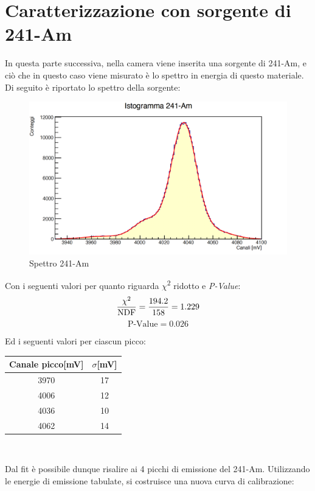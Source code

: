\documentclass[a4paper,10pt]{article}
\begin{document}
\section{Caratterizzazione con sorgente di 241-Am}
In questa parte successiva, nella camera viene inserita una sorgente di 241-Am, e ci\`o che in questo caso viene misurato \`e lo spettro in energia di questo materiale. Di seguito \`e riportato lo spettro della sorgente:

\begin{figure}[h!]
    \centering
    \includegraphics[scale=0.45]{grafici/istoame}
    \caption{Spettro 241-Am}
\end{figure}

\noindent Con i seguenti valori per quanto riguarda $\chi$\textsuperscript{2} ridotto e \textit{P-Value}:
$$
    \frac{\chi\textsuperscript{2}}{\textrm{NDF}} = \frac{194.2}{158} = 1.229
$$
$$
    \textrm{P-Value} = 0.026
$$

\noindent Ed i seguenti valori per ciascun picco:

\begin{center}
    \begin{tabular}{cc}
        \toprule
        Canale picco[mV] & $\sigma$[mV] \\
        \midrule
        3970 & 17\\
        4006 & 12\\
        4036 & 10\\
        4062 & 14\\
        \bottomrule
    \end{tabular}\\
\end{center}

\noindent Dal fit \`e possibile dunque risalire ai 4 picchi di emissione del 241-Am. Utilizzando le energie di emissione tabulate, si costruisce una nuova curva di calibrazione:
\end{document}
